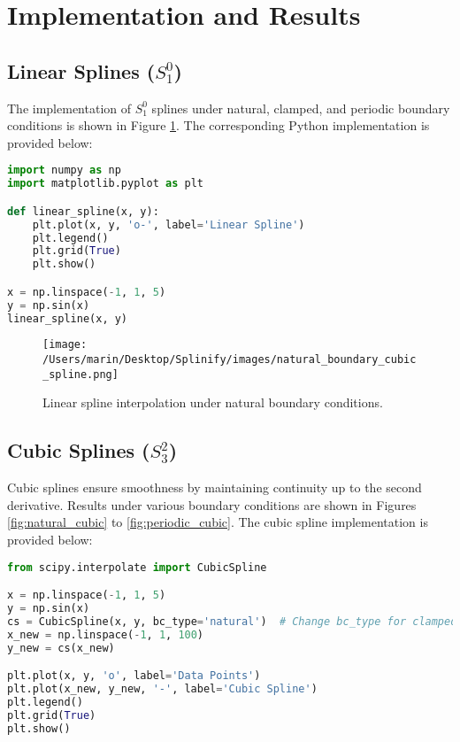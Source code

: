\documentclass[11pt,a4paper]{article}
\begin{document}
\section{Implementation and Results}
\subsection{Linear Splines (\texorpdfstring{$S_1^0$}{S10})}
The implementation of \(S_1^0\) splines under natural, clamped, and periodic boundary conditions is shown in Figure \ref{fig:linear_spline}. The corresponding Python implementation is provided below:
\begin{lstlisting}[language=Python, caption=Linear Spline Implementation]
import numpy as np
import matplotlib.pyplot as plt

def linear_spline(x, y):
    plt.plot(x, y, 'o-', label='Linear Spline')
    plt.legend()
    plt.grid(True)
    plt.show()

x = np.linspace(-1, 1, 5)
y = np.sin(x)
linear_spline(x, y)
\end{lstlisting}

\begin{figure}[h!]
    \centering
    \texttt{[image: /Users/marin/Desktop/Splinify/images/natural\_boundary\_cubic\_spline.png]}
    \caption{Linear spline interpolation under natural boundary conditions.}
    \label{fig:linear_spline}
\end{figure}

\subsection{Cubic Splines (\texorpdfstring{$S_3^2$}{S32})}
Cubic splines ensure smoothness by maintaining continuity up to the second derivative. Results under various boundary conditions are shown in Figures \ref{fig:natural_cubic} to \ref{fig:periodic_cubic}. The cubic spline implementation is provided below:
\begin{lstlisting}[language=Python, caption=Cubic Spline Implementation]
from scipy.interpolate import CubicSpline

x = np.linspace(-1, 1, 5)
y = np.sin(x)
cs = CubicSpline(x, y, bc_type='natural')  # Change bc_type for clamped/periodic
x_new = np.linspace(-1, 1, 100)
y_new = cs(x_new)

plt.plot(x, y, 'o', label='Data Points')
plt.plot(x_new, y_new, '-', label='Cubic Spline')
plt.legend()
plt.grid(True)
plt.show()
\end{lstlisting}
\end{document}
